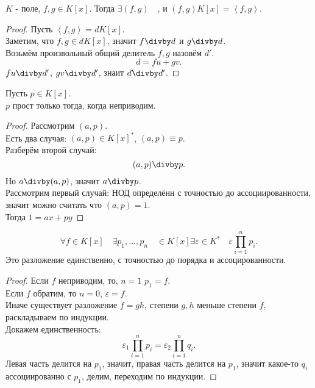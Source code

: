 \documentclass[11pt, oneside]{article}   	%
\begin{document}
   \begin{tlemma}
       $K$ - поле, $f, g\in K[x]$. Тогда $\exists{(f, g)}\quad$, и $(f,g)K[x] = \left<f, g\right>$.
       \begin{proof}
           Пусть $\left<f, g\right> = dK[x]$.\\
           Заметим, что $f,g\in dK[x]$, значит $f\divby d$ и $g\divby d$.\\
           Возьмём произвольный общий делитель $f, g$ назовём $d'$.\\
           \[ d = fu + gv .\]
           $fu\divby d'$,  $gv\divby d'$, знаит $d\divby d'$.
       \end{proof}
   \end{tlemma}
    \begin{dlemma}
        Пусть $p\in K[x]$.\\
        $p$ прост только тогда, когда неприводим.\\
        \begin{proof}
            Рассмотрим $(a,p)$.\\
            Есть два случая: $(a,p)\in K[x]^{*}$, $(a,p) \equiv p$.\\
            Разберём второй случай:
            \[ (a,p)\divby p .\]
            Но $a\divby(a,p)$, значит $a\divby p$.\\
            Рассмотрим первый случай: НОД определённ с точностью до ассоциированности, значит можно считать что $(a,p)=1$.\\
            Тогда $1=ax+py$ %
        \end{proof}
    \end{dlemma}
    \begin{theorem}
        \[ \forall{f\in K[x]}\quad \exists{p_1, \ldots, p_n}\quad\in K[x] \exists{\varepsilon\in K^{*}}\quad \varepsilon \prod\limits_{i=1}^{n} p_i    .\] 
        Это разложение единственно, с точностью до порядка и ассоцированности.
        \begin{proof}
            Если $f$ неприводим, то, $n=1$  $p_1=f$.\\
            Если $f$ обратим, то $n=0$, $\varepsilon=f$.\\
            Иначе существует разложение $f=gh$, степени $g,h$ меньше степени $f$, раскладываем по индукции.\\
            Докажем единственность:\\
            \[ \varepsilon_1 \prod\limits_{i=1}^{n} p_i = \varepsilon_2 \prod\limits_{i=1}^{n} q_i  .\]
            Левая часть делится на $p_1$, значит, правая часть делится на $p_1$, значит какое-то $q_i$ ассоциированно с $p_1$, делим, переходим по индукции.
        \end{proof}
    \end{theorem}
\end{document}
